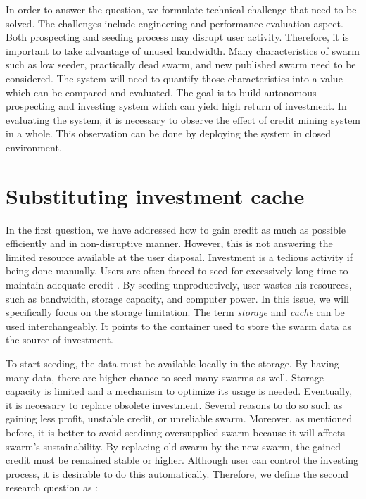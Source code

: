 In order to answer the question, we formulate technical challenge that need to be solved. The challenges include engineering and performance evaluation aspect. Both prospecting and seeding process may disrupt user activity. Therefore, it is important to take advantage of unused bandwidth. Many characteristics of swarm such as low seeder, practically dead swarm, and new published swarm need to be considered. The system will need to quantify those characteristics into a value which can be compared and evaluated. The goal is to build autonomous prospecting and investing system which can yield high return of investment. In evaluating the system, it is necessary to observe the effect of credit mining system in a whole. This observation can be done by deploying the system in closed environment. 

\section{Substituting investment cache}
In the first question, we have addressed how to gain credit as much as possible efficiently and in non-disruptive manner. However, this is not answering the limited resource available at the user disposal. Investment is a tedious activity if being done manually. Users are often forced to seed for excessively long time to maintain adequate credit \cite{2013:survivepriv:jia}. By seeding unproductively, user wastes his resources, such as bandwidth, storage capacity, and computer power. In this issue, we will specifically focus on the storage limitation. The term \textit{storage} and \textit{cache} can be used interchangeably. It points to the container used to store the swarm data as the source of investment.

To start seeding, the data must be available locally in the storage. By having many data, there are higher chance to seed many swarms as well. Storage capacity is limited and a mechanism to optimize its usage is needed. Eventually, it is necessary to replace obsolete investment. Several reasons to do so such as gaining less profit, unstable credit, or unreliable swarm. Moreover, as mentioned before, it is better to avoid seedinng oversupplied swarm because it will affects swarm's sustainability. By replacing old swarm by the new swarm, the gained credit must be remained stable or higher. Although user can control the investing process, it is desirable to do this automatically. Therefore, we define the second research question as : 

